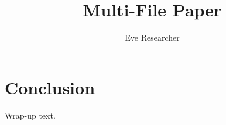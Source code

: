 \documentclass{article}
\title{Multi-File Paper}
\author{Eve Researcher}
\begin{document}
\maketitle




\section{Conclusion}
Wrap-up text.
\end{document}
